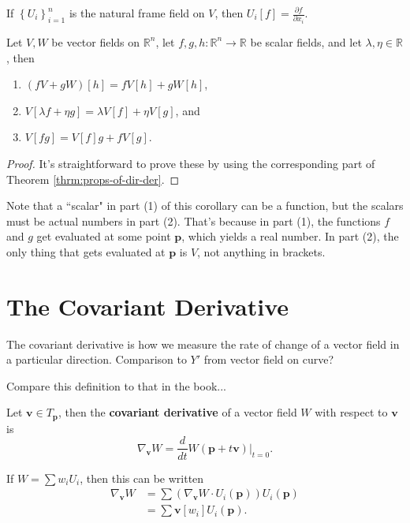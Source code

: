 \documentclass[10pt]{report}
\begin{document}
\begin{ex}
If $\left\{ U_i \right\}_{i=1}^n$ is the natural frame field on $V$, then $U_i[f] = \frac{\partial f}{\partial x_i} .$
\end{ex}

\begin{cor}
	Let $V,W$ be vector fields on $\mathbb{R}^n$, let $f,g,h:\mathbb{R}^n \to \mathbb{R}$ be scalar fields, and let $\lambda,\eta \in \mathbb{R}$, then
	\begin{enumerate}
		\item $(fV+gW)[h] = fV[h] + gW[h]$,
		\item $V[\lambda f+\eta g] = \lambda V[f] + \eta V[g]$, and
		\item $V[fg] = V[f] g + f V[g]$.
	\end{enumerate}
\end{cor}
\begin{proof}
	It's straightforward to prove these by using the corresponding part of Theorem \ref{thrm:props-of-dir-der}.
\end{proof}

Note that a ``scalar" in part (1) of this corollary can be a function, but the scalars must be actual numbers in part (2). That's because in part (1), the functions $f$ and $g$ get evaluated at some point $\mathbf{p}$, which yields a real number. In part (2), the only thing that gets evaluated at $\mathbf{p}$ is $V$, not anything in brackets.



\section{The Covariant Derivative}

The covariant derivative is how we measure the rate of change of a vector field in a particular direction. {\color{red}Comparison to $Y'$ from vector field on curve?}

{\color{red}Compare this definition to that in the book...}

\begin{defn}[]
	Let $\mathbf{v} \in T_{\mathbf{p}}$, then the \textbf{covariant derivative} of a vector field $W$ with respect to $\mathbf{v}$ is
	\[
		\nabla_{\mathbf{v}}W = \frac{d }{d t} W(\mathbf{p}+t\mathbf{v})\Big|_{t=0}.
	\] 
\end{defn}

If $W = \sum w_i U_i$, then this can be written
\begin{align*}
	\nabla_{\mathbf{v}}W &= \sum \left( \nabla_{\mathbf{v}}W \cdot U_i(\mathbf{p}) \right) U_i(\mathbf{p}) \\
			     &= \sum \mathbf{v}[w_i]U_i(\mathbf{p}).
\end{align*}
\end{document}
